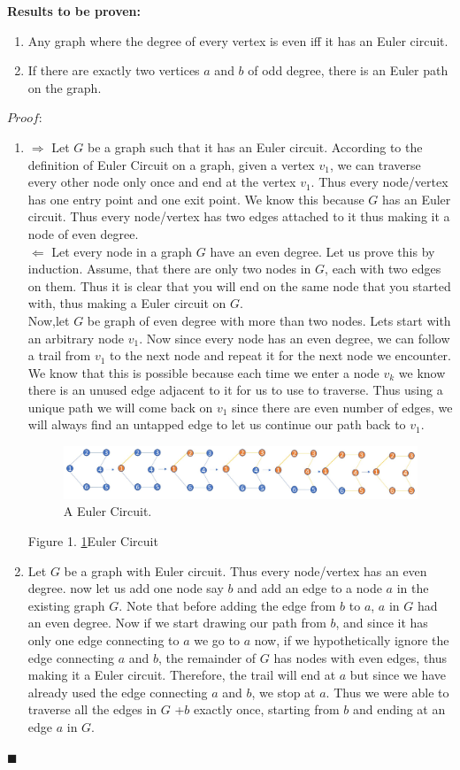 \documentclass[12pt, fullpage]{article}
\newcommand*{\QEDA}{\hfill\ensuremath{\blacksquare}}%
\begin{document}
\textbf{Results to be proven: }

\begin{enumerate}
	\item Any graph where the degree of every vertex is even iff it has an Euler circuit.
	\item If there are exactly two vertices $a$ and $b$ of odd degree, there is an Euler path on the graph.
\end{enumerate}
$Proof:$
\begin{enumerate}
	\item
 	$\Rightarrow$ Let $G$ be a graph such that it has an Euler circuit. According to the definition of Euler Circuit on a graph, given a vertex $v_1$, we can traverse every other node only once and end at the vertex $v_1$. Thus every node/vertex has one entry point and one exit point. We know this because $G$ has an Euler circuit. Thus every node/vertex has two edges attached to it thus making it a node of even degree. \\
 	$\Leftarrow$ Let every node in a graph $G$ have an even degree. Let us prove this by induction. Assume, that there are only two nodes in $G$, each with two edges on them. Thus it is clear that you will end on the same node that you started with, thus making a Euler circuit on $G$. \\
 	Now,let $G$ be  graph of even degree with more than two nodes. Lets start with an arbitrary node $v_1$. Now since every node has an even degree, we can follow a trail from $v_1$ to the next node and repeat it for the next node we encounter. We know that this is possible because each time we enter a node $v_k$ we know there is an unused edge adjacent to it for us to use to traverse. Thus using a unique path we will come back on $v_1$ since there are even number of edges, we will always find an untapped edge to let us continue our path back to $v_1$.
\begin{figure}[h!]
  \includegraphics[width=\linewidth	]{circuit.jpg}
  \caption{A Euler Circuit.}
  \label{fig:ec1}
\end{figure} 	
 	Figure 1. \ref{fig:ec1}Euler Circuit
	\item
	Let $G$ be a graph with Euler circuit. Thus every node/vertex has an even degree. now let us add one node say $b$ and add an edge to a node $a$ in the existing graph $G$. Note that before adding the edge from $b$ to $a$, $a$ in $G$ had an even degree. Now if we start drawing our path from $b$, and since it has only one edge connecting to $a$ we go to $a$ now, if we hypothetically ignore the edge connecting $a$ and $b$, the remainder of $G$ has nodes with even edges, thus making it a Euler circuit. Therefore, the trail will end at $a$ but since we have already used the edge connecting $a$ and $b$, we stop at $a$. Thus we were able to traverse all the edges in $G$ +$b$ exactly once, starting from $b$ and ending at an edge $a$ in $G$.
\end{enumerate}

\QEDA
\end{document}
